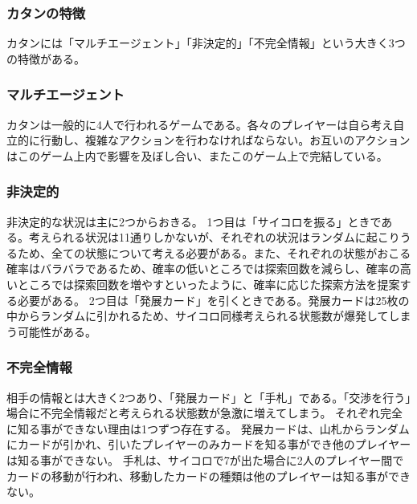 \documentclass[a4, 10pt,dvipdfmx]{jsarticle}
\begin{document}
\subsubsection{カタンの特徴}

カタンには「マルチエージェント」「非決定的」「不完全情報」という大きく3つの特徴がある。

\subsubsection*{マルチエージェント}
カタンは一般的に4人で行われるゲームである。各々のプレイヤーは自ら考え自立的に行動し、複雑なアクションを行わなければならない。お互いのアクションはこのゲーム上内で影響を及ぼし合い、またこのゲーム上で完結している。
\subsubsection*{非決定的}
非決定的な状況は主に2つからおきる。
1つ目は「サイコロを振る」ときである。考えられる状況は11通りしかないが、それぞれの状況はランダムに起こりうるため、全ての状態について考える必要がある。また、それぞれの状態がおこる確率はバラバラであるため、確率の低いところでは探索回数を減らし、確率の高いところでは探索回数を増やすといったように、確率に応じた探索方法を提案する必要がある。
2つ目は「発展カード」を引くときである。発展カードは25枚の中からランダムに引かれるため、サイコロ同様考えられる状態数が爆発してしまう可能性がある。
\subsubsection*{不完全情報}
相手の情報とは大きく2つあり、「発展カード」と「手札」である。「交渉を行う」場合に不完全情報だと考えられる状態数が急激に増えてしまう。
それぞれ完全に知る事ができない理由は1つずつ存在する。
発展カードは、山札からランダムにカードが引かれ、引いたプレイヤーのみカードを知る事ができ他のプレイヤーは知る事ができない。
手札は、サイコロで7が出た場合に2人のプレイヤー間でカードの移動が行われ、移動したカードの種類は他のプレイヤーは知る事ができない。


\end{document}
